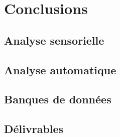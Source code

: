 \chapter{Conclusions}\label{ch:end_conc}

\section{Analyse sensorielle}

\section{Analyse automatique}

\section{Banques de données}

\section{Délivrables}





